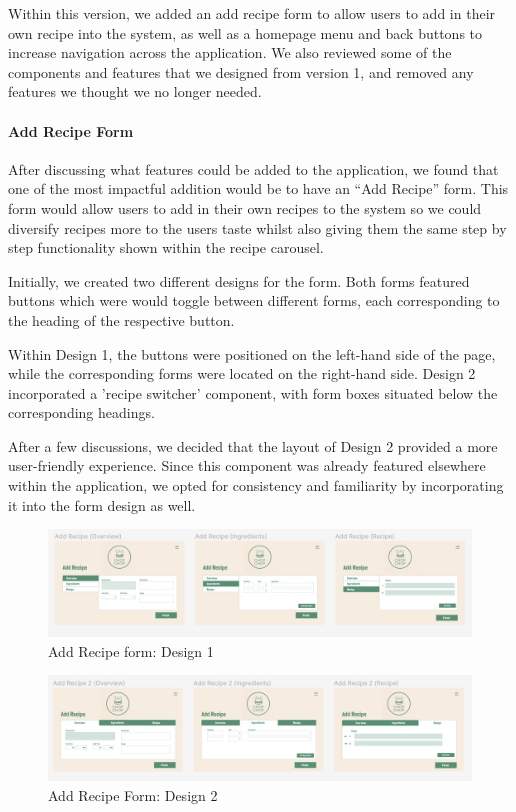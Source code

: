 \documentclass{article}
\begin{document}
Within this version, we added an add recipe form to allow users to add in their
own recipe into the system, as well as a homepage menu and back buttons to
increase navigation across the application. We also reviewed some of the
components and features that we designed from version 1, and removed any
features we thought we no longer needed.

\paragraph{Add Recipe Form}
After discussing what features could be added to the application, we found that
one of the most impactful addition would be to have an “Add Recipe” form. This
form would allow users to add in their own recipes to the system so we could
diversify recipes more to the users taste whilst also giving them the same step
by step functionality shown within the recipe carousel.

Initially, we created two different designs for the form. Both forms featured
buttons which were would toggle between different forms, each corresponding to
the heading of the respective button.

Within Design 1, the buttons were positioned on the left-hand side of the page,
while the corresponding forms were located on the right-hand side. Design 2
incorporated a 'recipe switcher' component, with form boxes situated below the
corresponding headings.

After a few discussions, we decided that the layout of Design 2 provided a more
user-friendly experience. Since this component was already featured elsewhere
within the application, we opted for consistency and familiarity by
incorporating it into the form design as well.

\begin{figure}[h]
  \includegraphics[width=1.0\textwidth]{assets/design-images/Design 1 Add Recipe Form.png}
  \centering
  \caption{Add Recipe form: Design 1 }
\end{figure}

\begin{figure}[h]
  \includegraphics[width=1.0\textwidth]{assets/design-images/Design 2 Add Recipe Form.png}
  \centering
  \caption{Add Recipe Form: Design 2}
\end{figure}
\end{document}
